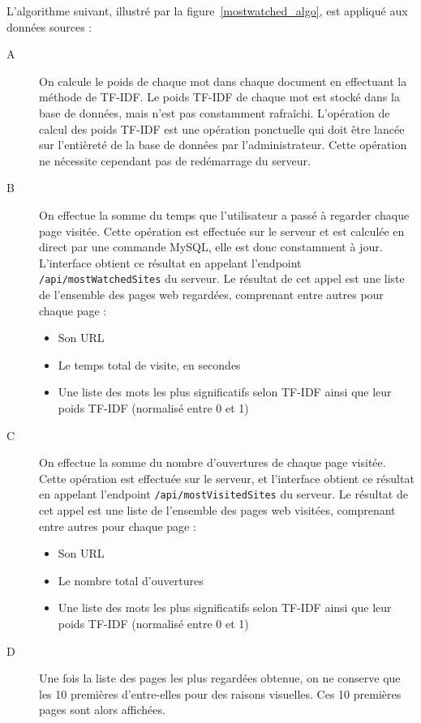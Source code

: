 		L'algorithme suivant, illustré par la figure~\ref{mostwatched_algo}, est appliqué aux données sources :
		\begin{description}
			\item[A] On calcule le poids de chaque mot dans chaque document en effectuant la méthode de TF-IDF. Le poids TF-IDF de chaque mot est stocké dans la base de données, mais n'est pas constamment rafraîchi. L'opération de calcul des poids TF-IDF est une opération ponctuelle qui doit être lancée sur l'entièreté de la base de données par l'administrateur. Cette opération ne nécessite cependant pas de redémarrage du serveur.

			\item[B] On effectue la somme du temps que l'utilisateur a passé à regarder chaque page visitée. Cette opération est effectuée sur le serveur et est calculée en direct par une commande MySQL, elle est donc constamment à jour. L'interface obtient ce résultat en appelant l'endpoint \texttt{/api/mostWatchedSites} du serveur. Le résultat de cet appel est une liste de l'ensemble des pages web regardées, comprenant entre autres pour chaque page : 
			\begin{itemize}
				\item Son URL
				\item Le temps total de visite, en secondes
				\item Une liste des mots les plus significatifs selon TF-IDF ainsi que leur poids TF-IDF (normalisé entre 0 et 1)
			\end{itemize}

			\item[C] On effectue la somme du nombre d'ouvertures de chaque page visitée. Cette opération est effectuée sur le serveur, et l'interface obtient ce résultat en appelant l'endpoint \texttt{/api/mostVisitedSites} du serveur. Le résultat de cet appel est une liste de l'ensemble des pages web visitées, comprenant entre autres pour chaque page : 
			\begin{itemize}
				\item Son URL
				\item Le nombre total d'ouvertures
				\item Une liste des mots les plus significatifs selon TF-IDF ainsi que leur poids TF-IDF (normalisé entre 0 et 1)
			\end{itemize}
			
			\item[D] Une fois la liste des pages les plus regardées obtenue, on ne conserve que les 10 premières d'entre-elles pour des raisons visuelles. Ces 10 premières pages sont alors affichées.


\end{description}
